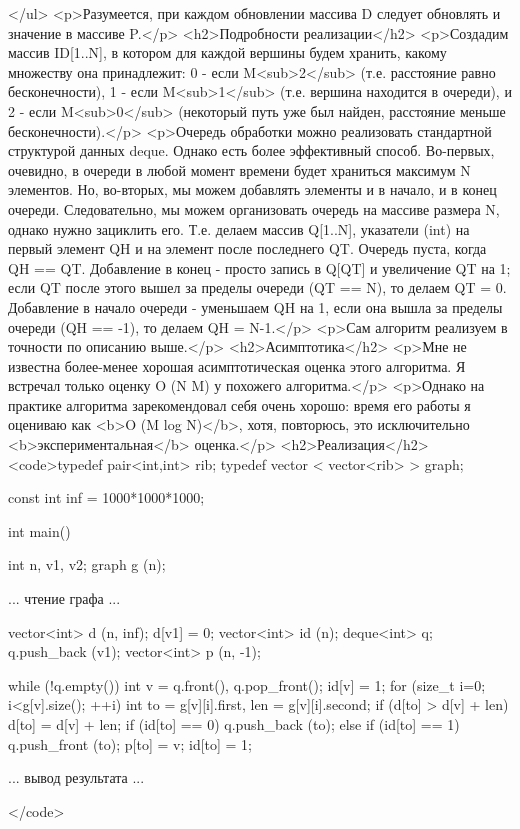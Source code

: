 </ul>
<p>Разумеется, при каждом обновлении массива D следует обновлять и значение в массиве P.</p>
<h2>Подробности реализации</h2>
<p>Создадим массив ID[1..N], в котором для каждой вершины будем хранить, какому множеству она принадлежит: 0 - если M<sub>2</sub> (т.е. расстояние равно бесконечности), 1 - если M<sub>1</sub> (т.е. вершина находится в очереди), и 2 - если M<sub>0</sub> (некоторый путь уже был найден, расстояние меньше бесконечности).</p>
<p>Очередь обработки можно реализовать стандартной структурой данных deque. Однако есть более эффективный способ. Во-первых, очевидно, в очереди в любой момент времени будет храниться максимум N элементов. Но, во-вторых, мы можем добавлять элементы и в начало, и в конец очереди. Следовательно, мы можем организовать очередь на массиве размера N, однако нужно зациклить его. Т.е. делаем массив Q[1..N], указатели (int) на первый элемент QH и на элемент после последнего QT. Очередь пуста, когда QH == QT. Добавление в конец - просто запись в Q[QT] и увеличение QT на 1; если QT после этого вышел за пределы очереди (QT == N), то делаем QT = 0. Добавление в начало очереди - уменьшаем QH на 1, если она вышла за пределы очереди (QH == -1), то делаем QH = N-1.</p>
<p>Сам алгоритм реализуем в точности по описанию выше.</p>
<h2>Асимптотика</h2>
<p>Мне не известна более-менее хорошая асимптотическая оценка этого алгоритма. Я встречал только оценку O (N M) у похожего алгоритма.</p>
<p>Однако на практике алгоритма зарекомендовал себя очень хорошо: время его работы я оцениваю как <b>O (M log N)</b>, хотя, повторюсь, это исключительно <b>экспериментальная</b> оценка.</p>
<h2>Реализация</h2>
<code>typedef pair<int,int> rib;
typedef vector < vector<rib> > graph;

const int inf = 1000*1000*1000;


int main()
{
	int n, v1, v2;
	graph g (n);

	... чтение графа ...

	vector<int> d (n, inf);
	d[v1] = 0;
	vector<int> id (n);
	deque<int> q;
	q.push_back (v1);
	vector<int> p (n, -1);

	while (!q.empty())
	{
		int v = q.front(),  q.pop_front();
		id[v] = 1;
		for (size_t i=0; i<g[v].size(); ++i)
		{
			int to = g[v][i].first, len = g[v][i].second;
			if (d[to] > d[v] + len)
			{
				d[to] = d[v] + len;
				if (id[to] == 0)
					q.push_back (to);
				else if (id[to] == 1)
					q.push_front (to);
				p[to] = v;
				id[to] = 1;
			}
		}
	}

	... вывод результата ...

}</code>
